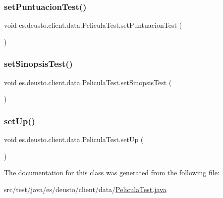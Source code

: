 \subsubsection{\texorpdfstring{setPuntuacionTest()}{setPuntuacionTest()}}
{\footnotesize\ttfamily void es.\+deusto.\+client.\+data.\+Pelicula\+Test.\+set\+Puntuacion\+Test (\begin{DoxyParamCaption}{ }\end{DoxyParamCaption})}

\mbox{\label{classes_1_1deusto_1_1client_1_1data_1_1_pelicula_test_a6f1e767e4d22a993afb8905dcafe01ec}} 
\subsubsection{\texorpdfstring{setSinopsisTest()}{setSinopsisTest()}}
{\footnotesize\ttfamily void es.\+deusto.\+client.\+data.\+Pelicula\+Test.\+set\+Sinopsis\+Test (\begin{DoxyParamCaption}{ }\end{DoxyParamCaption})}

\mbox{\label{classes_1_1deusto_1_1client_1_1data_1_1_pelicula_test_a9c5dde13ae55f8d389db5a36d1f13fd1}} 
\subsubsection{\texorpdfstring{setUp()}{setUp()}}
{\footnotesize\ttfamily void es.\+deusto.\+client.\+data.\+Pelicula\+Test.\+set\+Up (\begin{DoxyParamCaption}{ }\end{DoxyParamCaption})}



The documentation for this class was generated from the following file\+:\begin{DoxyCompactItemize}
\item 
src/test/java/es/deusto/client/data/\mbox{\hyperlink{_pelicula_test_8java}{Pelicula\+Test.\+java}}\end{DoxyCompactItemize}

